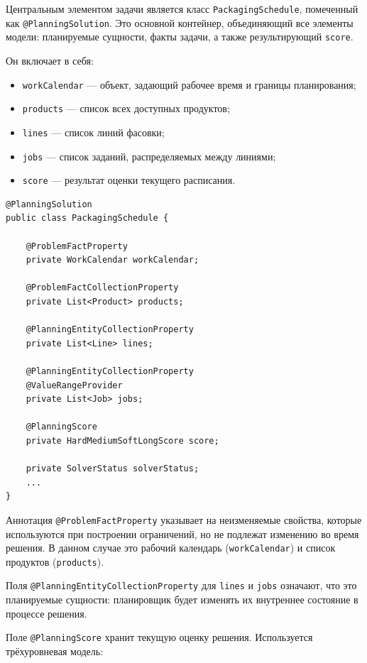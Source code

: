 Центральным элементом задачи является класс \texttt{PackagingSchedule}, помеченный как \texttt{@PlanningSolution}. Это основной контейнер, объединяющий все элементы модели: планируемые сущности, факты задачи, а также результирующий \texttt{score}.

Он включает в себя:

\begin{itemize}
    \item \texttt{workCalendar} — объект, задающий рабочее время и границы планирования;
    \item \texttt{products} — список всех доступных продуктов;
    \item \texttt{lines} — список линий фасовки;
    \item \texttt{jobs} — список заданий, распределяемых между линиями;
    \item \texttt{score} — результат оценки текущего расписания.
\end{itemize}

\begin{lstlisting}[caption={Класс PackagingSchedule}, label={lst:classPackagingSchedule}]
@PlanningSolution
public class PackagingSchedule {

    @ProblemFactProperty
    private WorkCalendar workCalendar;

    @ProblemFactCollectionProperty
    private List<Product> products;

    @PlanningEntityCollectionProperty
    private List<Line> lines;

    @PlanningEntityCollectionProperty
    @ValueRangeProvider
    private List<Job> jobs;

    @PlanningScore
    private HardMediumSoftLongScore score;

    private SolverStatus solverStatus;
    ...
}
\end{lstlisting}

Аннотация \texttt{@ProblemFactProperty} указывает на неизменяемые свойства, которые используются при построении ограничений, но не подлежат изменению во время решения. В данном случае это рабочий календарь (\texttt{workCalendar}) и список продуктов (\texttt{products}).

Поля \texttt{@PlanningEntityCollectionProperty} для \texttt{lines} и \texttt{jobs} означают, что это планируемые сущности: планировщик будет изменять их внутреннее состояние в процессе решения.

Поле \texttt{@PlanningScore} хранит текущую оценку решения. Используется трёхуровневая модель:

